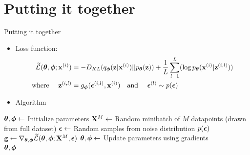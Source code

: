 \documentclass{beamer}
\begin{document}
\section{Putting it together}
\begin{frame}{Putting it together}
    \begin{itemize}
        \item {
            Loss function:
            \begin{align*}
                \widetilde{\mathcal{L}}^{}(\boldsymbol{\theta},\boldsymbol{\phi}; \mathbf{x}^{(i)})
                &= - D_{KL}(q_{\boldsymbol{\phi}}(\mathbf{z}|\mathbf{x}^{(i)}) || p_{\boldsymbol{\theta}}(\mathbf{z}))
                + \frac{1}{L} \sum_{l=1}^L (\log p_{\boldsymbol{\theta}}(\mathbf{x}^{(i)}|\mathbf{z}^{(i,l)})) \\
                \text{where \quad} \mathbf{z}^{(i,l)} &= g_{\boldsymbol{\phi}}(\boldsymbol{\epsilon}^{(i,l)},\mathbf{x}^{(i)})
                \text{\quad and \quad} \boldsymbol{\epsilon}^{(l)} \sim p(\boldsymbol{\epsilon})
            \end{align*}
        }
    \item {
        Algorithm
    }
    \end{itemize}

    \begin{algorithm}[H]
        \begin{algorithmic}
            \State $\boldsymbol{\theta}, \boldsymbol{\phi} \gets$ Initialize parameters
            \Repeat
                \State $\mathbf{X}^M \gets $ Random minibatch of $M$ datapoints (drawn from full dataset)
                \State $\boldsymbol{\epsilon} \gets $ Random samples from noise distribution $p(\boldsymbol{\epsilon})$
                \State $\mathbf{g} \gets \nabla_{\boldsymbol{\theta},\boldsymbol{\phi}} \widetilde{\mathcal{L}}^{}(\boldsymbol{\theta},\boldsymbol{\phi}; \mathbf{X}^M,\boldsymbol{\epsilon})$
                \State $\boldsymbol{\theta}, \boldsymbol{\phi} \gets $ Update parameters using gradients
             \\
            \Return $\boldsymbol{\theta}, \boldsymbol{\phi}$
        \end{algorithmic}
    \end{algorithm}
\end{frame}

\end{document}
